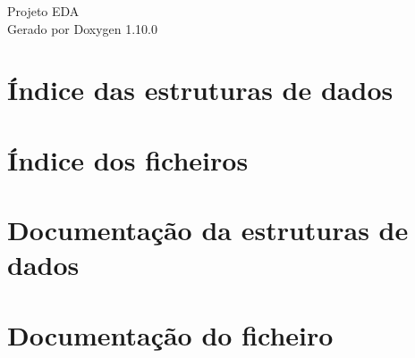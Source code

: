 \documentclass[twoside]{book}
\newcommand{\+}{\discretionary{\mbox{\scriptsize$\hookleftarrow$}}{}{}}
\newcommand{\clearemptydoublepage}{%
    \newpage{\pagestyle{empty}\cleardoublepage}%
  }
\begin{document}
  \raggedbottom
    \hypersetup{pageanchor=false,
                bookmarksnumbered=true,
                pdfencoding=unicode
               }
  \begin{titlepage}
  \vspace*{7cm}
  \begin{center}%
  {\Large Projeto EDA}\\
  \vspace*{1cm}
  {\large Gerado por Doxygen 1.10.0}\\
  \end{center}
  \end{titlepage}
  \clearemptydoublepage
  \tableofcontents
  \clearemptydoublepage
  \hypersetup{pageanchor=true}

\chapter{Índice das estruturas de dados}

\chapter{Índice dos ficheiros}

\chapter{Documentação da estruturas de dados}


\chapter{Documentação do ficheiro}
















  \backmatter
  \newpage
  \clearemptydoublepage
  \printindex
\end{document}
